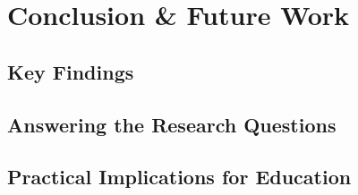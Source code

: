 \section{Conclusion \& Future Work} \label{sec:conclusion-and-future-work}


\subsection{Key Findings}



\vp

\subsection{Answering the Research Questions}

\vp

\subsection{Practical Implications for Education}

